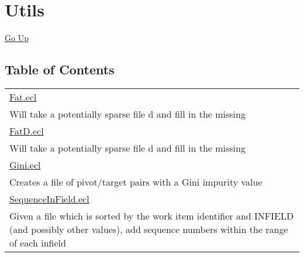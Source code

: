 \chapter*{\color{headtoc} Utils}
\hypertarget{ecldoc:toc:root/ML_Core/Utils}{}
\hyperlink{ecldoc:toc:}{Go Up}


\section*{Table of Contents}
{\renewcommand{\arraystretch}{1.5}
\begin{longtable}{|p{\textwidth}|}
\hline
\hyperlink{ecldoc:toc:ML_Core.Utils.Fat}{Fat.ecl} \\
Will take a potentially sparse file d and fill in the missing \\
\hline
\hyperlink{ecldoc:toc:ML_Core.Utils.FatD}{FatD.ecl} \\
Will take a potentially sparse file d and fill in the missing \\
\hline
\hyperlink{ecldoc:toc:ML_Core.Utils.Gini}{Gini.ecl} \\
Creates a file of pivot/target pairs with a Gini impurity value \\
\hline
\hyperlink{ecldoc:toc:ML_Core.Utils.SequenceInField}{SequenceInField.ecl} \\
Given a file which is sorted by the work item identifier and INFIELD (and possibly other values), add sequence numbers within the range of each infield \\
\hline
\end{longtable}
}





